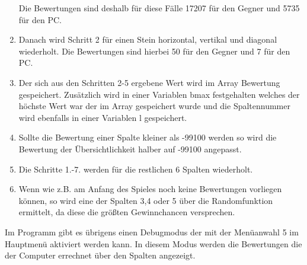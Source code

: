 \documentclass[10pt,a4paper,titlepage]{article}
\begin{document}
\begin{enumerate}
   Die Bewertungen sind deshalb für diese Fälle 17207 für den Gegner und 5735 für den PC.
	\item Danach wird Schritt 2 für einen Stein horizontal, vertikal und diagonal wiederholt. Die Bewertungen sind hierbei 50 für den Gegner und 7 für den PC.
	\item Der sich aus den Schritten 2-5 ergebene Wert wird im Array Bewertung gespeichert. Zusätzlich wird in einer Variablen bmax festgehalten welches der höchste Wert war der im Array gespeichert wurde und die Spaltennummer wird ebenfalls in einer Variablen l gespeichert.
	\item Sollte die Bewertung einer Spalte kleiner als -99100 werden so wird die Bewertung der Übersichtlichkeit halber auf -99100 angepasst.
	\item Die Schritte 1.-7. werden für die restlichen 6 Spalten wiederholt.
	\item Wenn wie z.B. am Anfang des Spieles noch keine Bewertungen vorliegen können, so wird eine der Spalten 3,4 oder 5 über die Randomfunktion ermittelt, da diese die größten Gewinnchancen versprechen.
\end{enumerate}
Im Programm gibt es übrigens einen Debugmodus der mit der Menüanwahl 5 im Hauptmenü aktiviert werden kann.
In diesem Modus werden die Bewertungen die der Computer errechnet über den Spalten angezeigt.
\end{document}
